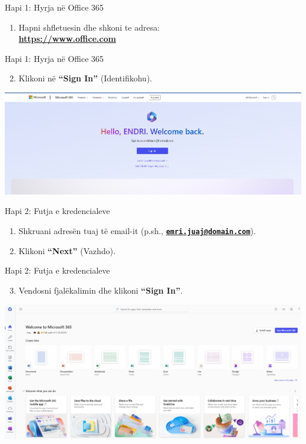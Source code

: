 \documentclass[
  ignorenonframetext,
]{beamer}
\providecommand{\tightlist}{%
  \setlength{\itemsep}{0pt}\setlength{\parskip}{0pt}}
\begin{document}
\begin{frame}{Hapi 1: Hyrja në Office 365}
\label{hapi-1-hyrja-nuxeb-office-365}
\begin{enumerate}
\tightlist
\item
  Hapni shfletuesin dhe shkoni te adresa:\\
  \textbf{\url{https://www.office.com}}
\end{enumerate}
\end{frame}

\begin{frame}{Hapi 1: Hyrja në Office 365}
\label{hapi-1-hyrja-nuxeb-office-365-1}
\begin{enumerate}
\setcounter{enumi}{1}
\tightlist
\item
  Klikoni në \textbf{``Sign In''} (Identifikohu).
\end{enumerate}

\includegraphics{./images/outlook1.png}
\end{frame}

\begin{frame}{Hapi 2: Futja e kredencialeve}
\label{hapi-2-futja-e-kredencialeve}
\begin{enumerate}
\item
  Shkruani adresën tuaj të email-it (p.sh.,
  \textbf{\href{mailto:emri.juaj@domain.com}{\nolinkurl{emri.juaj@domain.com}}}).
\item
  Klikoni \textbf{``Next''} (Vazhdo).
\end{enumerate}
\end{frame}

\begin{frame}{Hapi 2: Futja e kredencialeve}
\label{hapi-2-futja-e-kredencialeve-1}
\begin{enumerate}
\setcounter{enumi}{2}
\tightlist
\item
  Vendosni fjalëkalimin dhe klikoni \textbf{``Sign In''}.
\end{enumerate}

\includegraphics{./images/outlook2.png}
\end{frame}
\end{document}
